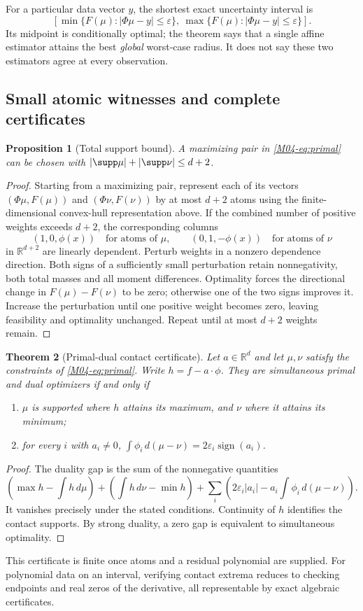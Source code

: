 \documentclass[11pt,a4paper]{article}
\newtheorem{theorem}{Theorem}[section]
\newtheorem{proposition}[theorem]{Proposition}
\theoremstyle{definition}\newtheorem{definition}[theorem]{Definition}
\theoremstyle{remark}\newtheorem{remark}[theorem]{Remark}
\newcommand{\R}{\mathbb R}\newcommand{\C}{\mathbb C}\newcommand{\N}{\mathbb N}
\numberwithin{equation}{section}
\begin{document}
For a particular data vector $y$, the shortest exact uncertainty interval is
\[
 [\min\{F(\mu):|\Phi\mu-y|\le\varepsilon\},\
   \max\{F(\mu):|\Phi\mu-y|\le\varepsilon\}].
\]
Its midpoint is conditionally optimal; the theorem says that a single affine estimator attains the best \emph{global} worst-case radius. It does not say these two estimators agree at every observation.

\subsection{Small atomic witnesses and complete certificates}\label{M04-sec-4}
\begin{proposition}[Total support bound]
A maximizing pair in \eqref{M04-eq:primal} can be chosen with
$|\supp\mu|+|\supp\nu|\le d+2$.
\end{proposition}
\begin{proof}
Starting from a maximizing pair, represent each of its vectors $(\Phi\mu,F(\mu))$ and $(\Phi\nu,F(\nu))$ by at most $d+2$ atoms using the finite-dimensional convex-hull representation above. If the combined number of positive weights exceeds $d+2$, the corresponding columns
\[
 (1,0,\phi(x))\quad\text{for atoms of }\mu,
 \qquad (0,1,-\phi(x))\quad\text{for atoms of }\nu
\]
in $\R^{d+2}$ are linearly dependent. Perturb weights in a nonzero dependence direction. Both signs of a sufficiently small perturbation retain nonnegativity, both total masses and all moment differences. Optimality forces the directional change in $F(\mu)-F(\nu)$ to be zero; otherwise one of the two signs improves it. Increase the perturbation until one positive weight becomes zero, leaving feasibility and optimality unchanged. Repeat until at most $d+2$ weights remain.
\end{proof}

\begin{theorem}[Primal-dual contact certificate]
Let $a\in\R^d$ and let $\mu,\nu$ satisfy the constraints of \eqref{M04-eq:primal}. Write $h=f-a\cdot\phi$. They are simultaneous primal and dual optimizers if and only if
\begin{enumerate}[label=(\roman*)]
\item $\mu$ is supported where $h$ attains its maximum, and $\nu$ where it attains its minimum;
\item for every $i$ with $a_i\ne0$,
$\int\phi_i\,d(\mu-\nu)=2\varepsilon_i\operatorname{sign}(a_i)$.
\end{enumerate}
\end{theorem}
\begin{proof}
The duality gap is the sum of the nonnegative quantities
\[
 (\max h-\textstyle\int h\,d\mu)
 +(\textstyle\int h\,d\nu-\min h)
 +\sum_i\left(2\varepsilon_i|a_i|-a_i\textstyle\int\phi_i\,d(\mu-\nu)\right).
\]
It vanishes precisely under the stated conditions. Continuity of $h$ identifies the contact supports. By strong duality, a zero gap is equivalent to simultaneous optimality.
\end{proof}
This certificate is finite once atoms and a residual polynomial are supplied. For polynomial data on an interval, verifying contact extrema reduces to checking endpoints and real zeros of the derivative, all representable by exact algebraic certificates.
\end{document}
